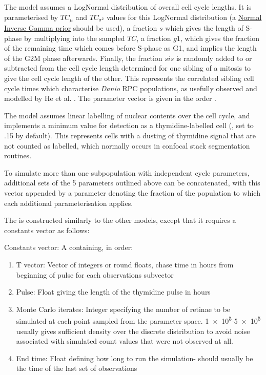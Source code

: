 The model assumes a LogNormal distribution of overall cell cycle lengths. It is parameterised by $TC_{\mu}$ and $TC_{\sigma^{2}}$ values for this LogNormal distribution (a \hyperref[ssec:normalgamma]{Normal Inverse Gamma prior} should be used), a fraction $s$ which gives the length of S-phase by multiplying into the sampled $TC$, a fraction $g1$, which gives the fraction of the remaining time which comes before S-phase as G1, and implies the length of the G2\/M phase afterwards. Finally, the fraction $sis$ is randomly added to or subtracted from the cell cycle length determined for one sibling of a mitosis to give the cell cycle length of the other. This represents the correlated sibling cell cycle times which characterise \textit{Danio} RPC populations, as usefully observed and modelled by He et al. \cite{He2012}. The parameter vector is given in the order .

The model assumes linear labelling of nuclear contents over the cell cycle, and implements a minimum value for detection as a thymidine-labelled cell (, set to .15 by default). This represents cells with a dusting of thymidine signal that are not counted as labelled, which normally occurs in confocal stack segmentation routines.

To simulate more than one subpopulation with independent cycle parameters, additional sets of the 5 parameters outlined above can be concatenated, with this vector appended by a parameter denoting the fraction of the population to which each additional parameterisation applies.

The  is constructed similarly to the other models, except that it requires a constants vector as follows:

Constants vector: A  containing, in order:
\begin{enumerate}
    \item T vector: Vector of integers or round floats, chase time in hours from beginning of pulse for each observations subvector
    \item Pulse: Float giving the length of the thymidine pulse in hours
    \item Monte Carlo iterates: Integer specifying the number of retinae to be simulated at each point sampled from the parameter space. \num{1e5}-\num{5e5} usually gives sufficient density over the discrete distribution to avoid noise associated with simulated count values that were not observed at all.
    \item End time: Float defining how long to run the simulation- should usually be the time of the last set of observations
\end{enumerate}


